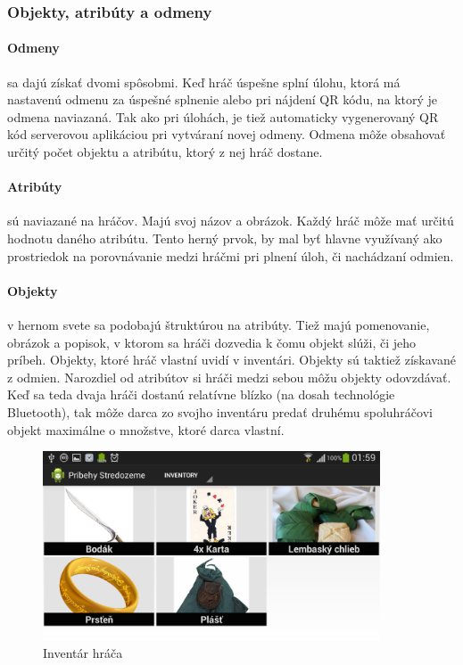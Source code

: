 \subsubsection{Objekty, atribúty a odmeny}
\paragraph{Odmeny} sa dajú získať dvomi spôsobmi. Keď hráč úspešne splní úlohu, ktorá má nastavenú odmenu za úspešné splnenie alebo pri nájdení QR kódu, na ktorý je odmena naviazaná. Tak ako pri úlohách, je tiež automaticky vygenerovaný QR kód serverovou aplikáciou pri vytváraní novej odmeny. Odmena môže obsahovať určitý počet objektu a atribútu, ktorý z nej hráč dostane.

\paragraph{Atribúty} sú naviazané na hráčov. Majú svoj názov a obrázok. Každý hráč môže mať určitú hodnotu daného atribútu. Tento herný prvok, by mal byť hlavne využívaný ako prostriedok na porovnávanie medzi hráčmi pri plnení úloh, či nachádzaní odmien. 

\paragraph{Objekty} v hernom svete sa podobajú štruktúrou na atribúty. Tiež majú pomenovanie, obrázok a popisok, v ktorom sa hráči dozvedia k čomu objekt slúži, či jeho príbeh. Objekty, ktoré hráč vlastní uvidí v inventári. Objekty sú taktiež získavané z odmien. Narozdiel od atribútov si hráči medzi sebou môžu objekty odovzdávať. Keď sa teda dvaja hráči dostanú relatívne blízko (na dosah technológie Bluetooth), tak môže darca zo svojho inventáru predať druhému spoluhráčovi objekt maximálne o množstve, ktoré darca vlastní.
\begin{figure}[ht!]
  \centering
  \includegraphics[width=10cm]{mainmatter/imgs/klient_inventory2.png}
  \caption{Inventár hráča}
  \label{fig:klient_inventory}
\end{figure}



